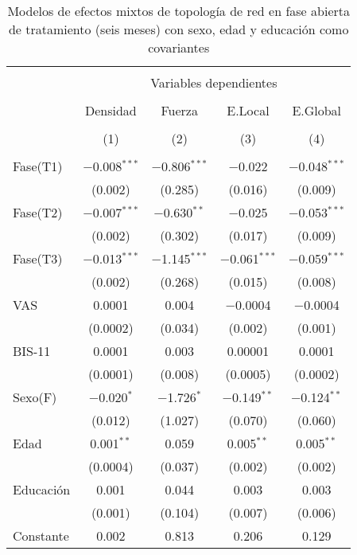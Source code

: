 \begin{table}[!htbp] \centering
    \small
  \caption{Modelos de efectos mixtos de topología de red en fase abierta de tratamiento (seis meses) con sexo, edad y educación como covariantes}
  \label{tab:memL2}
\begin{tabular}{@{\extracolsep{5pt}}lcccc}
\\[-1.8ex]\hline
\hline \\[-1.8ex]
 & \multicolumn{4}{c}{Variables dependientes} \\
\cline{2-5}
\\[-1.8ex] & Densidad & Fuerza & E.Local & E.Global \\
\\[-1.8ex] & (1) & (2) & (3) & (4)\\
\hline \\[-1.8ex]
 Fase(T1) & $-$0.008$^{***}$ & $-$0.806$^{***}$ & $-$0.022 & $-$0.048$^{***}$ \\
  & (0.002) & (0.285) & (0.016) & (0.009) \\
  Fase(T2) & $-$0.007$^{***}$ & $-$0.630$^{**}$ & $-$0.025 & $-$0.053$^{***}$ \\
  & (0.002) & (0.302) & (0.017) & (0.009) \\
  Fase(T3) & $-$0.013$^{***}$ & $-$1.145$^{***}$ & $-$0.061$^{***}$ & $-$0.059$^{***}$ \\
  & (0.002) & (0.268) & (0.015) & (0.008) \\
  VAS & 0.0001 & 0.004 & $-$0.0004 & $-$0.0004 \\
  & (0.0002) & (0.034) & (0.002) & (0.001) \\
  BIS-11 & 0.0001 & 0.003 & 0.00001 & 0.0001 \\
  & (0.0001) & (0.008) & (0.0005) & (0.0002) \\
  Sexo(F) & $-$0.020$^{*}$ & $-$1.726$^{*}$ & $-$0.149$^{**}$ & $-$0.124$^{**}$ \\
  & (0.012) & (1.027) & (0.070) & (0.060) \\
  Edad & 0.001$^{**}$ & 0.059 & 0.005$^{**}$ & 0.005$^{**}$ \\
  & (0.0004) & (0.037) & (0.002) & (0.002) \\
  Educación & 0.001 & 0.044 & 0.003 & 0.003 \\
  & (0.001) & (0.104) & (0.007) & (0.006) \\
  Constante & 0.002 & 0.813 & 0.206 & 0.129 \\

\end{tabular}
\end{table}
